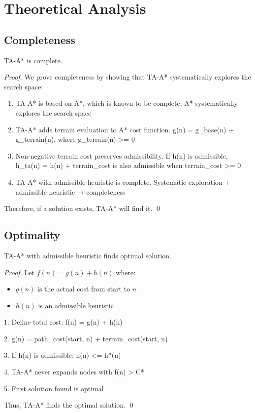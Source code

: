 
\section{Theoretical Analysis}

\subsection{Completeness}

\begin{theorem}
TA-A* is complete.
\end{theorem}

\begin{proof}
We prove completeness by showing that TA-A* systematically explores the search space:

\begin{enumerate}
\item TA-A* is based on A*, which is known to be complete. A* systematically explores the search space
\item TA-A* adds terrain evaluation to A* cost function. g(n) = g_base(n) + g_terrain(n), where g_terrain(n) >= 0
\item Non-negative terrain cost preserves admissibility. If h(n) is admissible, h_ta(n) = h(n) + terrain_cost is also admissible when terrain_cost >= 0
\item TA-A* with admissible heuristic is complete. Systematic exploration + admissible heuristic → completeness

\end{enumerate}

Therefore, if a solution exists, TA-A* will find it. \qed
\end{proof}

\subsection{Optimality}

\begin{theorem}
TA-A* with admissible heuristic finds optimal solution.
\end{theorem}

\begin{proof}
Let $f(n) = g(n) + h(n)$ where:
\begin{itemize}
\item $g(n)$ is the actual cost from start to $n$
\item $h(n)$ is an admissible heuristic
\end{itemize}

1. Define total cost: f(n) = g(n) + h(n)

2. g(n) = path_cost(start, n) + terrain_cost(start, n)

3. If h(n) is admissible: h(n) <= h*(n)

4. TA-A* never expands nodes with f(n) > C*

5. First solution found is optimal


Thus, TA-A* finds the optimal solution. \qed
\end{proof}

